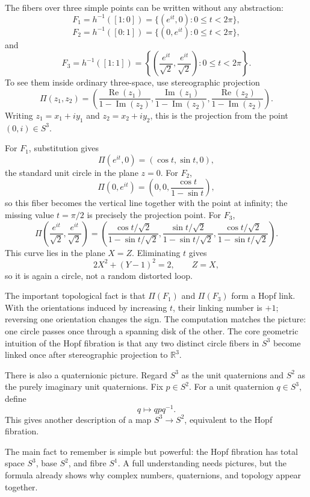 The fibers over three simple points can be written without any abstraction:
\[
  F_1=h^{-1}([1:0])
  =\{(e^{it},0):0\le t<2\pi\},
\]
\[
  F_2=h^{-1}([0:1])
  =\{(0,e^{it}):0\le t<2\pi\},
\]
and
\[
  F_3=h^{-1}([1:1])
  =
  \left\{\left(\frac{e^{it}}{\sqrt2},\frac{e^{it}}{\sqrt2}\right):0\le t<2\pi\right\}.
\]
To see them inside ordinary three-space, use stereographic projection
\[
  \Pi(z_1,z_2)=
  \left(
  \frac{\operatorname{Re}(z_1)}{1-\operatorname{Im}(z_2)},
  \frac{\operatorname{Im}(z_1)}{1-\operatorname{Im}(z_2)},
  \frac{\operatorname{Re}(z_2)}{1-\operatorname{Im}(z_2)}
  \right).
\]
Writing \(z_1=x_1+iy_1\) and \(z_2=x_2+iy_2\), this is the projection from the point \((0,i)\in S^3\).

For \(F_1\), substitution gives
\[
  \Pi(e^{it},0)=(\cos t,\sin t,0),
\]
the standard unit circle in the plane \(z=0\).  For \(F_2\),
\[
  \Pi(0,e^{it})
  =
  \left(0,0,\frac{\cos t}{1-\sin t}\right),
\]
so this fiber becomes the vertical line together with the point at infinity; the missing value \(t=\pi/2\) is precisely the projection point.  For \(F_3\),
\[
  \Pi\left(\frac{e^{it}}{\sqrt2},\frac{e^{it}}{\sqrt2}\right)
  =
  \left(
  \frac{\cos t/\sqrt2}{1-\sin t/\sqrt2},
  \frac{\sin t/\sqrt2}{1-\sin t/\sqrt2},
  \frac{\cos t/\sqrt2}{1-\sin t/\sqrt2}
  \right).
\]
This curve lies in the plane \(X=Z\).  Eliminating \(t\) gives
\[
  2X^2+(Y-1)^2=2,
  \qquad Z=X,
\]
so it is again a circle, not a random distorted loop.

The important topological fact is that \(\Pi(F_1)\) and \(\Pi(F_3)\) form a Hopf link.  With the orientations induced by increasing \(t\), their linking number is \(+1\); reversing one orientation changes the sign.  The computation matches the picture: one circle passes once through a spanning disk of the other.  The core geometric intuition of the Hopf fibration is that any two distinct circle fibers in \(S^3\) become linked once after stereographic projection to \(\mathbb R^3\).

There is also a quaternionic picture.  Regard \(S^3\) as the unit quaternions and \(S^2\) as the purely imaginary unit quaternions.  Fix \(p\in S^2\).  For a unit quaternion \(q\in S^3\), define
\[
  q\mapsto qpq^{-1}.
\]
This gives another description of a map \(S^3\to S^2\), equivalent to the Hopf fibration.

\begin{remark}
The main fact to remember is simple but powerful: the Hopf fibration has total space \(S^3\), base \(S^2\), and fibre \(S^1\).  A full understanding needs pictures, but the formula already shows why complex numbers, quaternions, and topology appear together.
\end{remark}

